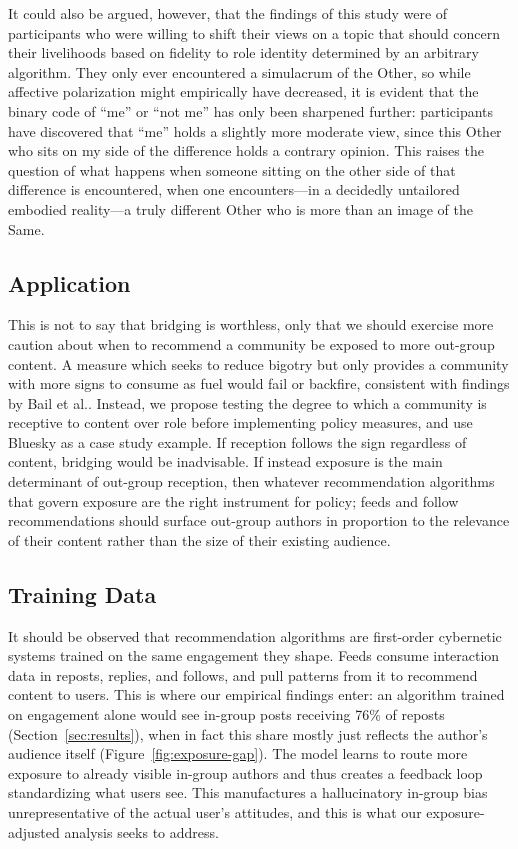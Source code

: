 \documentclass[11pt]{article}   %
\begin{document}
It could also be argued, however, that the findings of this study were of participants who were willing to shift their views on a topic that should concern their livelihoods based on fidelity to role identity determined by an arbitrary algorithm.
They only ever encountered a simulacrum of the Other, so while affective polarization might empirically have decreased, it is evident that the binary code of ``me'' or ``not me'' has only been sharpened further: participants
have discovered that ``me'' holds a slightly more moderate view, since this Other who sits on my side of the difference holds a contrary opinion. This raises the question of what happens when someone sitting
on the other side of that difference is encountered, when one encounters—in a decidedly untailored embodied reality—a truly different Other who is more than an image of the Same.

\subsection{Application}\label{sec:application}
This is not to say that bridging is worthless, only that we should exercise more caution about when to recommend a community be exposed to more out-group content. A measure which seeks to
reduce bigotry but only provides a community with more signs to consume as fuel would fail or backfire, consistent with findings by Bail et al.\parencite*{Bail2018}. Instead, we propose testing the degree to which a community is receptive to content over role
before implementing policy measures, and use Bluesky as a case study example. If reception follows the sign regardless of content, bridging would be inadvisable. If instead exposure is the main determinant of out-group reception, then whatever recommendation algorithms that govern exposure are the right instrument for policy; feeds and 
follow recommendations should surface out-group authors in proportion to the relevance of their content rather than the size of their existing audience.

\subsection{Training Data}\label{sec:training}
It should be observed that recommendation algorithms are first-order cybernetic systems trained on the same engagement they shape.
Feeds consume interaction data in reposts, replies, and follows, and pull patterns from it to recommend content to users. This is where our empirical findings enter: an algorithm
trained on engagement alone would see in-group posts receiving 76\% of reposts (Section~\ref{sec:results}), when in fact this share mostly just reflects the author's audience itself
(Figure~\ref{fig:exposure-gap}). The model learns to route more exposure to already visible in-group authors and thus creates a feedback loop standardizing what users see. This manufactures
a hallucinatory in-group bias unrepresentative of the actual user's attitudes, and this is what our exposure-adjusted analysis seeks to address.
\end{document}
